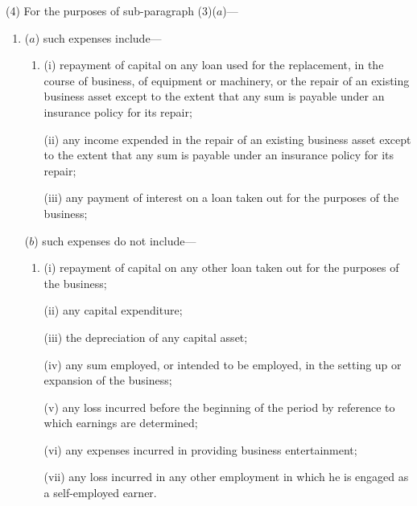 \documentclass[a4paper]{article}
\begin{document}
(4) For the purposes of sub-paragraph (3)($a$)—
\begin{enumerate}\item[]
($a$) such expenses include—
\begin{enumerate}\item[]
(i) repayment of capital on any loan used for the replacement, in the course of business, of equipment or machinery, or the repair of an existing business asset except to the extent that any sum is payable under an insurance policy for its repair;

(ii) any income expended in the repair of an existing business asset except to the extent that any sum is payable under an insurance policy for its repair;

(iii) any payment of interest on a loan taken out for the purposes of the business;
\end{enumerate}

($b$) such expenses do not include—
\begin{enumerate}\item[]
(i) repayment of capital on any other loan taken out for the purposes of the business;

(ii) any capital expenditure;

(iii) the depreciation of any capital asset;

(iv) any sum employed, or intended to be employed, in the setting up or expansion of the business;

(v) any loss incurred before the beginning of the period by reference to which earnings are determined;

(vi) any expenses incurred in providing business entertainment;

(vii) any loss incurred in any other employment in which he is engaged as a self-employed earner.
\end{enumerate}
\end{enumerate}

\end{document}
